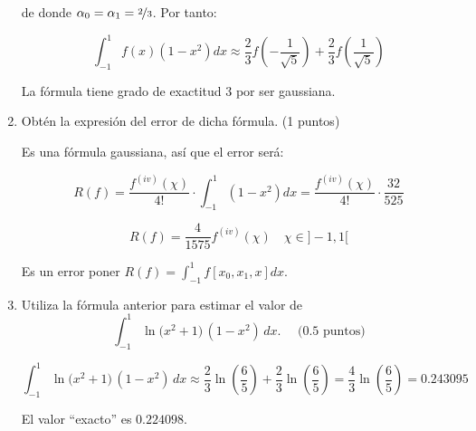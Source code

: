 \documentclass[12pt]{article}
\begin{document}
\begin{ejercicio}[3 puntos]
\begin{enumerate}
          de donde $\alpha_0 = \alpha_1 = \nicefrac{2}{3}$. Por tanto:

          $$\int_{-1}^{1} f(x) (1-x^2) dx \approx \dfrac{2}{3} f \left( -\dfrac{1}{\sqrt{5}} \right) + \dfrac{2}{3} f \left( \dfrac{1}{\sqrt{5}} \right)$$

          La fórmula tiene grado de exactitud $3$ por ser gaussiana.

          \item Obtén la expresión del error de dicha fórmula. (1 puntos) 
          
          Es una fórmula gaussiana, así que el error será:

          $$R(f) = \dfrac{f^{(iv)} (\chi)}{4!} \cdot \int_{-1}^{1} (1-x^2) dx = \dfrac{f^{(iv)} (\chi)}{4!} \cdot \dfrac{32}{525}$$

          $$R(f) = \dfrac{4}{1575} f^{(iv)}(\chi) \quad \chi \in ]-1,1[$$

          \begin{observacion}
            Es un error poner $R(f) = \displaystyle\int_{-1}^{1} f[x_0,x_1,x]dx$.
          \end{observacion}

          \item Utiliza la fórmula anterior para estimar el valor de
          \[
            \int_{-1}^{1} \ln\bigl(x^2+1\bigr)\,(1 - x^2)\,dx. \quad \text{ (0.5 puntos)}
          \]

          $$\int_{-1}^{1} \ln\bigl(x^2+1\bigr)\,(1 - x^2)\,dx \approx \dfrac{2}{3} \ln \left( \dfrac{6}{5} \right) + \dfrac{2}{3} \ln \left( \dfrac{6}{5} \right) = \dfrac{4}{3} \ln \left( \dfrac{6}{5} \right) = 0.243095$$

          \begin{observacion}
            El valor ``exacto'' es $0.224098$. 
          \end{observacion}
        \end{enumerate}
    \end{ejercicio}

    \newpage
\end{document}

